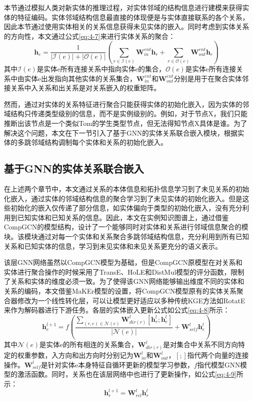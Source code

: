 本节通过模拟人类对新实体的推理过程，对实体邻域的结构信息进行建模来获得实体的特征编码。实体邻域结构信息最直接的体现便是与实体直接联系的各个关系，因此本节通过使用实体相关的关系信息获得未见实体的嵌入。同时考虑到实体关系的方向性，本文通过公式\ref{eq:4-7}来进行实体关系的聚合：
\begin{equation}
  \textbf{h}_{e} = \frac{1}{|\mathcal{I}(e)| + |\mathcal{O}(e)|} \left(
    \sum_{r\in \mathcal{I}(e)}\textbf{W}_{in}^{ent} \textbf{h}_{r} +
    \sum_{r\in \mathcal{O}(e)}\textbf{W}_{out}^{ent} \textbf{h}_{r}
    \right) \label{eq:4-7}
\end{equation}
其中\(\mathcal{I}(e)\)是实体e所有连接关系中指向实体e的集合，\(\mathcal{O}(e)\)是实体e所有连接关系中由实体e出发指向其他实体的关系集合，\(\textbf{W}_{in}^{ent}\)和\(\textbf{W}_{out}^{ent}\)分别是用于在聚合实体邻接关系中入关系和出关系是对关系嵌入的权重矩阵。

然而，通过对实体的关系特征进行聚合只能获得实体的初始化嵌入，因为实体的邻域结构只传递类型级别的信息，而不是实例级别的。例如，对于节点X，我们只能推断出该节点是一个类似Tom的学生类型节点，但无法得知节点X具体是谁。为了解决这个问题，本文在下一节引入了基于GNN的实体关系联合嵌入模块，根据实体的多跳邻域结构调制每个实体和关系的初始化嵌入。

\subsection{基于GNN的实体关系联合嵌入}
在上述两个章节中，本文通过关系的本体信息和拓扑信息学习到了未见关系的初始化嵌入，通过实体的邻域结构信息的聚合学习到了未见实体的初始化嵌入。但是这些初始化的嵌入仅传递了部分信息，如实体偏向于类型的初始化嵌入，没有充分利用到已知实体和已知关系的信息。因此，本文在实例知识图谱上，通过借鉴CompGCN的模型结构，设计了一个能够同时对实体和关系进行邻域信息聚合的模块。该模块通过对每一个实体和关系聚合多跳邻域结构信息，充分利用到所有已知关系和已知实体的信息，学习到未见实体和未见关系更充分的语义表示。

该层GNN网络虽然以CompGCN模型为基础，但是CompGCN原模型在对关系和实体进行聚合操作的时候采用了TransE、HoLE和DistMul模型的评分函数，限制了关系和实体的维度必须一致。为了使得该GNN网络能够输出维度不同的实体和关系的编码，本文借鉴MaKEr\cite{chen2022meta}模型的设置，将CompGCN模型原有的实体关系聚合器修改为一个线性转化层，可以让模型更好适应以多种传统KGE方法如RotatE来作为解码器进行下游任务。各层的实体嵌入更新公式如公式\ref{eq:4-8}所示：
\begin{equation}
\textbf{h}_{e}^{l+1} = f \left(
\frac{\sum_{(r,e)\in \mathcal{N}(e)}\textbf{W}_{dir(r)}^{l} [\textbf{h}_{r}^{l} ; \textbf{h}_{e}^{l}]}{|\mathcal{N}(e)|} + \textbf{W}_{self}^{l}\textbf{h}_{e}^{l}
\right) \label{eq:4-8}
\end{equation}
其中\(\mathcal{N}(e)\)是实体e的所有相连的关系集合，\(\textbf{W}_{dir(r)}^{l}\)是对集合中关系不同方向特定的权重参数，入方向和出方向时分别记为\(\textbf{W}_{in}^{l}\)和\(\textbf{W}_{out}^{l}\)，\([;]\)指代两个向量的连接操作。\(\textbf{W}_{self}^{l}\)是针对实体e本身特征自循环更新的模型学习参数，\(f\)指代模型GNN模型的激活函数。同时，关系也在该层网络中也进行了更新操作，如公式\ref{eq:4-9}所示：
\begin{equation}
\textbf{h}_{r}^{l+1} = \textbf{W}_{rel}^{l}\textbf{h}_{r}^{l} \label{eq:4-9}
\end{equation}

